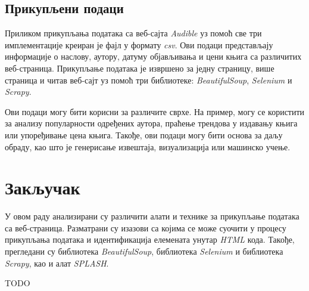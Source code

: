 \documentclass[12pt,oneside]{memoir}
\begin{document}
\section{Прикупљени подаци}
Приликом прикупљања података са веб-сајта \textit{Audible} уз помоћ све три имплементације креиран је фајл у формату \textit{csv}. Ови подаци представљају информације о наслову, аутору, датуму објављивања и цени књига са различитих веб-страница. Прикупљање података је извршено за једну страницу, више страница и читав веб-сајт уз помоћ три библиотеке: \textit{BeautifulSoup}, \textit{Selenium} и \textit{Scrapy}.

Ови подаци могу бити корисни за различите сврхе. На пример, могу се користити за анализу популарности одређених аутора, праћење трендова у издавању књига или упоређивање цена књига. Такође, ови подаци могу бити основа за даљу обраду, као што је генерисање извештаја, визуализација или машинско учење.

\chapter{Закључак}
\label{chp:zakljucak}
У овом раду анализирани су различити алати и технике за прикупљање података са веб-страница. Разматрани су изазови са којима се може суочити у процесу прикупљања података и идентификација елемената унутар \textit{HTML} кода. Такође, прегледани су библиотека \textit{BeautifulSoup}, библиотека \textit{Selenium} и библиотека \textit{Scrapy}, као и алат \textit{SPLASH}.

TODO


\literatura

\backmatter
\end{document}
